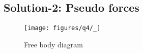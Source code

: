 \subsection*{Solution-2: Pseudo forces}

\begin{figure*}[htb]
    \centering
    \texttt{[image: figures/q4/\_]}
    \caption{
        Free body diagram
    }
\end{figure*}
